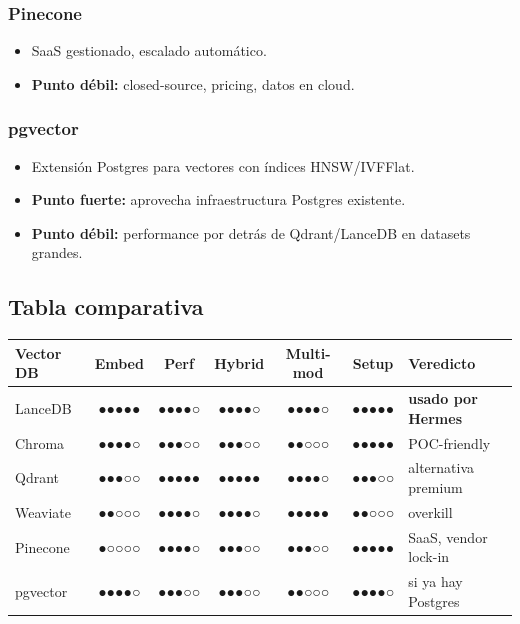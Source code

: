 \documentclass[11pt,a4paper]{article}
\newcommand{\scale}[1]{\textbf{\color{sotagreen}#1}}
\begin{document}
\subsubsection{Pinecone}
\begin{itemize}[leftmargin=*,itemsep=0pt]
\item SaaS gestionado, escalado automático.
\item \textbf{Punto débil:} closed-source, pricing, datos en cloud.
\end{itemize}

\subsubsection{pgvector}
\begin{itemize}[leftmargin=*,itemsep=0pt]
\item Extensión Postgres para vectores con índices HNSW/IVFFlat.
\item \textbf{Punto fuerte:} aprovecha infraestructura Postgres existente.
\item \textbf{Punto débil:} performance por detrás de Qdrant/LanceDB en datasets grandes.
\end{itemize}

\subsection{Tabla comparativa}

\begin{center}
\begin{tabularx}{0.95\textwidth}{|l|c|c|c|c|c|X|}
\hline
\rowcolor{sotared}\color{white}\textbf{Vector DB} & \color{white}\textbf{Embed} & \color{white}\textbf{Perf} & \color{white}\textbf{Hybrid} & \color{white}\textbf{Multi-mod} & \color{white}\textbf{Setup} & \color{white}\textbf{Veredicto}\\
\hline
\rowcolor{hermespos}LanceDB & \scale{●●●●●} & ●●●●○ & ●●●●○ & ●●●●○ & \scale{●●●●●} & \textbf{usado por Hermes}\\
Chroma & ●●●●○ & ●●●○○ & ●●●○○ & ●●○○○ & \scale{●●●●●} & POC-friendly\\
Qdrant & ●●●○○ & \scale{●●●●●} & \scale{●●●●●} & ●●●●○ & ●●●○○ & alternativa premium\\
Weaviate & ●●○○○ & ●●●●○ & ●●●●○ & \scale{●●●●●} & ●●○○○ & overkill\\
Pinecone & ●○○○○ & ●●●●○ & ●●●○○ & ●●●○○ & \scale{●●●●●} & SaaS, vendor lock-in\\
pgvector & ●●●●○ & ●●●○○ & ●●●○○ & ●●○○○ & ●●●●○ & si ya hay Postgres\\
\hline
\end{tabularx}
\end{center}
\end{document}
